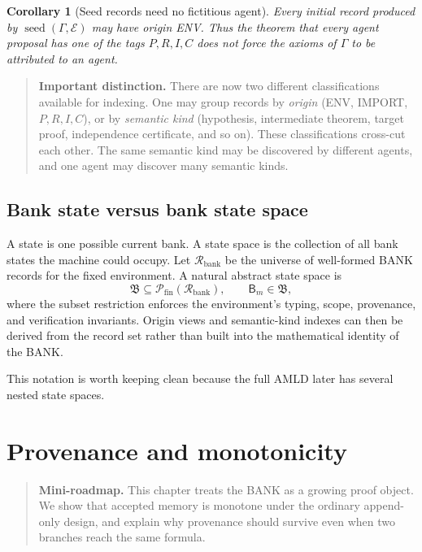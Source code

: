 \documentclass[11pt,openany]{book}
\newtheorem{corollary}[theorem]{Corollary}
\theoremstyle{definition}
\theoremstyle{remark}
\newenvironment{miniroadmap}{\begin{quote}\small\color{deepblue}\textbf{Mini-roadmap.} }{\end{quote}}
\newenvironment{warningbox}{\begin{quote}\small\color{red!50!black}\textbf{Important distinction.} }{\end{quote}}
\newcommand{\Bank}{\mathsf{B}}
\newcommand{\BankSpace}{\mathfrak{B}}
\newcommand{\Env}{\mathcal{E}}
\begin{document}
\begin{corollary}[Seed records need no fictitious agent]\label{cor:seedorigin}
Every initial record produced by $\operatorname{seed}(\Gamma,\Env)$ may have origin \textsf{ENV}. Thus the theorem that every \emph{agent proposal} has one of the tags $P,R,I,C$ does not force the axioms of $\Gamma$ to be attributed to an agent.
\end{corollary}

\begin{warningbox}
There are now two different classifications available for indexing. One may group records by \emph{origin} (ENV, IMPORT, $P,R,I,C$), or by \emph{semantic kind} (hypothesis, intermediate theorem, target proof, independence certificate, and so on). These classifications cross-cut each other. The same semantic kind may be discovered by different agents, and one agent may discover many semantic kinds.
\end{warningbox}

\section{Bank state versus bank state space}
A state is one possible current bank. A state space is the collection of all bank states the machine could occupy. Let $\mathcal R_{\mathrm{bank}}$ be the universe of well-formed BANK records for the fixed environment. A natural abstract state space is
\[
\BankSpace\subseteq\mathcal P_{\mathrm{fin}}(\mathcal R_{\mathrm{bank}}),
\qquad
\Bank_m\in\BankSpace,
\]
where the subset restriction enforces the environment's typing, scope, provenance, and verification invariants. Origin views and semantic-kind indexes can then be derived from the record set rather than built into the mathematical identity of the BANK.

This notation is worth keeping clean because the full AMLD later has several nested state spaces.

\chapter{Provenance and monotonicity}
\begin{miniroadmap}
This chapter treats the BANK as a growing proof object. We show that accepted memory is monotone under the ordinary append-only design, and explain why provenance should survive even when two branches reach the same formula.
\end{miniroadmap}
\end{document}
